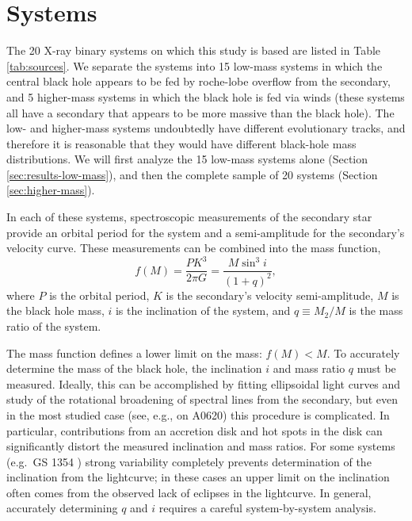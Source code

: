 \documentclass[preprint]{aastex}
\begin{document}
\section{Systems}
\label{sec:systems}

The 20 X-ray binary systems on which this study is based are listed in
Table \ref{tab:sources}.  We separate the systems into 15 low-mass
systems in which the central black hole appears to be fed by
roche-lobe overflow from the secondary, and 5 higher-mass systems in
which the black hole is fed via winds (these systems all have a
secondary that appears to be more massive than the black hole).  The
low- and higher-mass systems undoubtedly have different evolutionary
tracks, and therefore it is reasonable that they would have different
black-hole mass distributions.  We will first analyze the 15 low-mass
systems alone (Section \ref{sec:results-low-mass}), and then the
complete sample of 20 systems (Section \ref{sec:higher-mass}).

In each of these systems, spectroscopic measurements of the secondary
star provide an orbital period for the system and a semi-amplitude for
the secondary's velocity curve.  These measurements can be combined
into the mass function,
\begin{equation}
  \label{eq:mass-function}
  f(M) = \frac{P K^3}{2\pi G} = \frac{M \sin^3 i}{\left( 1 + q \right)^2},
\end{equation}
where $P$ is the orbital period, $K$ is the secondary's velocity
semi-amplitude, $M$ is the black hole mass, $i$ is the inclination of
the system, and $q \equiv M_2 / M$ is the mass ratio of the system.

The mass function defines a lower limit on the mass: $f(M) < M$.  To
accurately determine the mass of the black hole, the inclination $i$
and mass ratio $q$ must be measured.  Ideally, this can be
accomplished by fitting ellipsoidal light curves and study of the
rotational broadening of spectral lines from the secondary, but even
in the most studied case (see, e.g., \citet{Cantrell2010} on A0620)
this procedure is complicated.  In particular, contributions from an
accretion disk and hot spots in the disk can significantly distort the
measured inclination and mass ratios.  For some systems (e.g.\ GS 1354
\citep{Casares2009}) strong variability completely prevents
determination of the inclination from the lightcurve; in these cases
an upper limit on the inclination often comes from the observed lack
of eclipses in the lightcurve.  In general, accurately determining $q$
and $i$ requires a careful system-by-system analysis.
\end{document}
